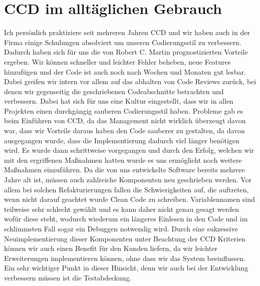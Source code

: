 \section{CCD im alltäglichen Gebrauch}
Ich persönlich praktiziere seit mehreren Jahren CCD und wir haben auch in der Firma einige Schulungen absolviert um unseren Codierungsstil zu verbessern. Dadurch haben sich für uns die von Robert C. Martin prognostizierten Vorteile ergeben. Wir können schneller und leichter Fehler beheben, neue Features hinzufügen und der Code ist auch noch nach Wochen und Monaten gut lesbar. Dabei greifen wir intern vor allem auf das abhalten von Code Reviews zurück, bei denen wir gegenseitig die geschriebenen Codeabschnitte betrachten und verbessern. Dabei hat sich für uns eine Kultur eingestellt, dass wir in allen Projekten einen durchgängig sauberen Codierungsstil haben. Probleme gab es beim Einführen von CCD, da das Management nicht wirklich überzeugt davon war, dass wir Vorteile daraus haben den Code sauberer zu gestalten, da davon ausgegangen wurde, dass die Implementierung dadurch viel länger benötigen wird. Es wurde dann schrittweise vorgegangen und durch den Erfolg, welchen wir mit den ergriffenen Maßnahmen hatten wurde es uns ermöglicht noch weitere Maßnahmen einzuführen. Da die von uns entwickelte Software bereits mehrere Jahre alt ist, müssen auch zahlreiche Komponenten neu geschrieben werden. Vor allem bei solchen Refakturierungen fallen die Schwierigkeiten auf, die auftreten, wenn nicht darauf geachtet wurde Clean Code zu schreiben. Variablennamen sind teilweise sehr schlecht gewählt und es kann daher nicht genau gesagt werden wofür diese steht, wodurch wiederum ein längeres Einlesen in den Code und im schlimmsten Fall sogar ein Debuggen notwendig wird. Durch eine sukzessive Neuimplementierung dieser Komponenten unter Beachtung der CCD Kriterien können wir auch einen Benefit für den Kunden liefern, da wir leichter Erweiterungen implementieren können, ohne dass wir das System beeinflussen. Ein sehr wichtiger Punkt in dieser Hinsicht, denn wir auch bei der Entwicklung verbessern müssen ist die Testabdeckung. 


